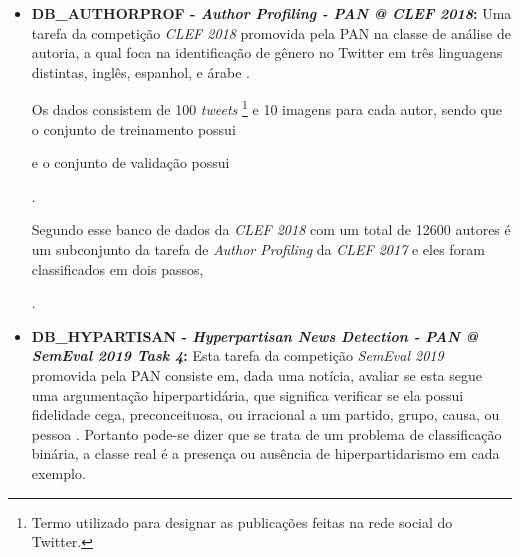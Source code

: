     \begin{itemize}
        \item \textbf{DB\_AUTHORPROF - \textit{Author Profiling - PAN @ CLEF 2018}:} Uma tarefa da competição \textit{CLEF 2018} promovida pela PAN na classe de análise de autoria, a qual foca na identificação de gênero no Twitter em três linguagens distintas, inglês, espanhol, e árabe \cite{PAN_APCLEF_2018}.
        
        Os dados consistem de 100 \textit{tweets}
        \footnote{Termo utilizado para designar as publicações feitas na rede social do Twitter.}
         e 10 imagens para cada autor, sendo que o conjunto de treinamento possui 
        e o conjunto de validação possui
        \cite{rangel2018overview}.
        
        Segundo  esse banco de dados da \textit{CLEF 2018} com um total de 12600 autores é um subconjunto da tarefa de \textit{Author Profiling} da \textit{CLEF 2017} e eles foram classificados em dois passos,
        \cite{rangel2017overview}.
        
        
        \item \textbf{DB\_HYPARTISAN - \textit{Hyperpartisan News Detection - PAN @ SemEval 2019 Task 4}:} Esta tarefa da competição \textit{SemEval 2019} promovida pela PAN consiste em, dada uma notícia, avaliar se esta segue uma argumentação hiperpartidária, que significa verificar se ela possui fidelidade cega, preconceituosa, ou irracional a um partido, grupo, causa, ou pessoa \cite{PAN_HND_2019}.
        Portanto pode-se dizer que se trata de um problema de classificação binária, a classe real é a presença ou ausência de hiperpartidarismo em cada exemplo.
        

\end{itemize}
